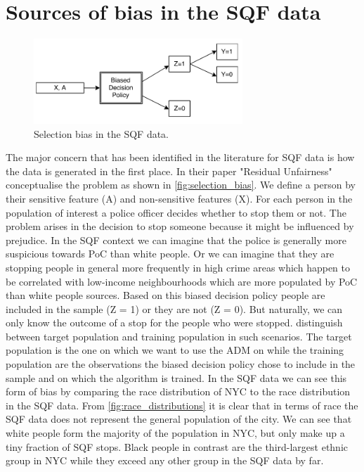 \section*{Sources of bias in the SQF data}
\begin{figure}
    \includegraphics[width=0.7\textwidth]{../figures/selection_bias.png}
    \caption{Selection bias in the SQF data.}
    \label{fig:selection_bias}
\end{figure}
The major concern that has been identified in the literature for SQF data is how the data is generated in the first place. In their paper "Residual Unfairness" \cite{kallus2018} conceptualise the problem as shown in \autoref{fig:selection_bias}.
We define a person by their sensitive feature (A) and non-sensitive features (X). For each person in the population of interest a police officer decides whether to stop them or not. The problem arises in the decision to stop someone because it might be influenced by prejudice. In the SQF context we can imagine that the police is generally more suspicious towards PoC than white people. Or we can imagine that they are stopping people in general more frequently in high crime areas which happen to be correlated with low-income neighbourhoods which are more populated by PoC than white people {\color{red}sources}. Based on this biased decision policy people are included in the sample (Z = 1) or they are not (Z = 0). But naturally, we can only know the outcome of a stop for the people who were stopped.
\cite{kallus2018} distinguish between target population and training population in such scenarios. The target population is the one on which we want to use the ADM on while the training population are the observations the biased decision policy chose to include in the sample and on which the algorithm is trained.
In the SQF data we can see this form of bias by comparing the race distribution of NYC to the race distribution in the SQF data. From \autoref{fig:race_distributions} it is clear that in terms of race the SQF data does not represent the general population of the city. We can see that white people form the majority of the population in NYC, but only make up a tiny fraction of SQF stops. Black people in contrast are the third-largest ethnic group in NYC while they exceed any other group in the SQF data by far.
